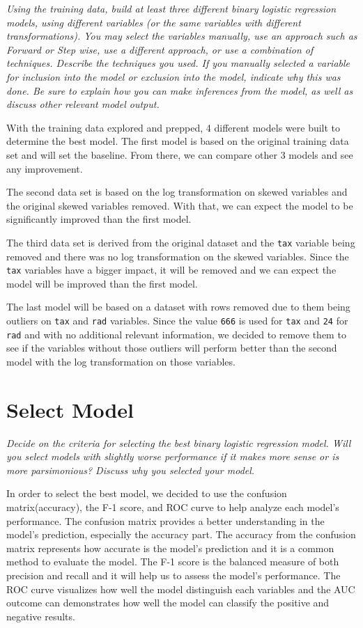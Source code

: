 \documentclass[
]{article}
\begin{document}
\emph{Using the training data, build at least three different binary
logistic regression models, using different variables (or the same
variables with different transformations). You may select the variables
manually, use an approach such as Forward or Step wise, use a different
approach, or use a combination of techniques. Describe the techniques
you used. If you manually selected a variable for inclusion into the
model or exclusion into the model, indicate why this was done. Be sure
to explain how you can make inferences from the model, as well as
discuss other relevant model output.}

With the training data explored and prepped, 4 different models were
built to determine the best model. The first model is based on the
original training data set and will set the baseline. From there, we can
compare other 3 models and see any improvement.

The second data set is based on the log transformation on skewed
variables and the original skewed variables removed. With that, we can
expect the model to be significantly improved than the first model.

The third data set is derived from the original dataset and the
\texttt{tax} variable being removed and there was no log transformation
on the skewed variables. Since the \texttt{tax} variables have a bigger
impact, it will be removed and we can expect the model will be improved
than the first model.

The last model will be based on a dataset with rows removed due to them
being outliers on \texttt{tax} and \texttt{rad} variables. Since the
value \texttt{666} is used for \texttt{tax} and \texttt{24} for
\texttt{rad} and with no additional relevant information, we decided to
remove them to see if the variables without those outliers will perform
better than the second model with the log transformation on those
variables.

\section{Select Model}\label{select-model}

\emph{Decide on the criteria for selecting the best binary logistic
regression model. Will you select models with slightly worse performance
if it makes more sense or is more parsimonious? Discuss why you selected
your model.}

In order to select the best model, we decided to use the confusion
matrix(accuracy), the F-1 score, and ROC curve to help analyze each
model's performance. The confusion matrix provides a better
understanding in the model's prediction, especially the accuracy part.
The accuracy from the confusion matrix represents how accurate is the
model's prediction and it is a common method to evaluate the model. The
F-1 score is the balanced measure of both precision and recall and it
will help us to assess the model's performance. The ROC curve visualizes
how well the model distinguish each variables and the AUC outcome can
demonstrates how well the model can classify the positive and negative
results.
\end{document}
